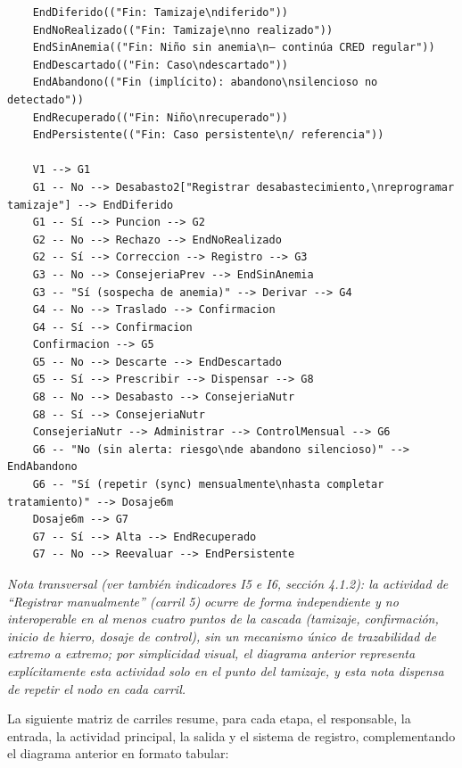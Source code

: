 \documentclass[11pt,a4paper]{article}
\begin{document}
\begin{samepage}
\begin{verbatim}
    EndDiferido(("Fin: Tamizaje\ndiferido"))
    EndNoRealizado(("Fin: Tamizaje\nno realizado"))
    EndSinAnemia(("Fin: Niño sin anemia\n— continúa CRED regular"))
    EndDescartado(("Fin: Caso\ndescartado"))
    EndAbandono(("Fin (implícito): abandono\nsilencioso no detectado"))
    EndRecuperado(("Fin: Niño\nrecuperado"))
    EndPersistente(("Fin: Caso persistente\n/ referencia"))

    V1 --> G1
    G1 -- No --> Desabasto2["Registrar desabastecimiento,\nreprogramar tamizaje"] --> EndDiferido
    G1 -- Sí --> Puncion --> G2
    G2 -- No --> Rechazo --> EndNoRealizado
    G2 -- Sí --> Correccion --> Registro --> G3
    G3 -- No --> ConsejeriaPrev --> EndSinAnemia
    G3 -- "Sí (sospecha de anemia)" --> Derivar --> G4
    G4 -- No --> Traslado --> Confirmacion
    G4 -- Sí --> Confirmacion
    Confirmacion --> G5
    G5 -- No --> Descarte --> EndDescartado
    G5 -- Sí --> Prescribir --> Dispensar --> G8
    G8 -- No --> Desabasto --> ConsejeriaNutr
    G8 -- Sí --> ConsejeriaNutr
    ConsejeriaNutr --> Administrar --> ControlMensual --> G6
    G6 -- "No (sin alerta: riesgo\nde abandono silencioso)" --> EndAbandono
    G6 -- "Sí (repetir (sync) mensualmente\nhasta completar tratamiento)" --> Dosaje6m
    Dosaje6m --> G7
    G7 -- Sí --> Alta --> EndRecuperado
    G7 -- No --> Reevaluar --> EndPersistente
\end{verbatim}\end{samepage}

\emph{Nota transversal (ver también indicadores I5 e I6, sección 4.1.2): la actividad de ``Registrar manualmente'' (carril 5) ocurre de forma independiente y no interoperable en al menos cuatro puntos de la cascada (tamizaje, confirmación, inicio de hierro, dosaje de control), sin un mecanismo único de trazabilidad de extremo a extremo; por simplicidad visual, el diagrama anterior representa explícitamente esta actividad solo en el punto del tamizaje, y esta nota dispensa de repetir el nodo en cada carril.}

La siguiente matriz de carriles resume, para cada etapa, el responsable, la entrada, la actividad principal, la salida y el sistema de registro, complementando el diagrama anterior en formato tabular:
\end{document}
